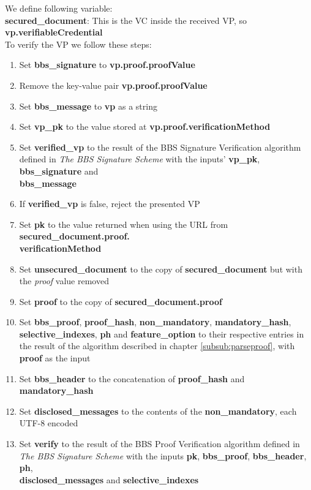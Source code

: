 \documentclass[
	a4paper               %
	,BCOR=0mm            %
	,bibliography=totoc   %
	,listof=totoc         %
	,monolingual
	,twoside=false
]{bfhthesis}              %
\begin{document}
We define following variable:\\
\textbf{secured\_document}: This is the VC inside the received VP, so \textbf{vp.verifiableCredential}\\

To verify the VP we follow these steps:
\begin{enumerate}
	\item Set \textbf{bbs\_signature} to \textbf{vp.proof.proofValue}
	\item Remove the key-value pair \textbf{vp.proof.proofValue}
	\item Set \textbf{bbs\_message} to \textbf{vp} as a string
	\item Set \textbf{vp\_pk} to the value stored at \textbf{vp.proof.verificationMethod}
	\item Set \textbf{verified\_vp} to the result of the BBS Signature Verification algorithm defined in \textit{The BBS Signature Scheme}\cite{bbs-signature-scheme} with the inputs' \textbf{vp\_pk}, \textbf{bbs\_signature} and \\\textbf{bbs\_message}
	\item If \textbf{verified\_vp} is false, reject the presented VP
	\item Set \textbf{pk} to the value returned when using the URL from \textbf{secured\_document.proof.}\\
	\noindent
	\textbf{verificationMethod}
	\item Set \textbf{unsecured\_document} to the copy of \textbf{secured\_document} but with the \textit{proof} value removed
	\item Set \textbf{proof} to the copy of \textbf{secured\_document.proof}
	\item Set \textbf{bbs\_proof}, \textbf{proof\_hash}, \textbf{non\_mandatory}, \textbf{mandatory\_hash}, \textbf{selective\_indexes}, \textbf{ph} and \textbf{feature\_option} to their respective entries in the result of the algorithm described in chapter \ref{subsub:parseproof}, with \textbf{proof} as the input
	\item Set \textbf{bbs\_header} to the concatenation of \textbf{proof\_hash} and \textbf{mandatory\_hash}
	\item Set \textbf{disclosed\_messages} to the contents of the \textbf{non\_mandatory}, each UTF-8 encoded
	\item Set \textbf{verify} to the result of the BBS Proof Verification algorithm defined in \textit{The BBS Signature Scheme}\cite{bbs-signature-scheme} with the inputs \textbf{pk}, \textbf{bbs\_proof}, \textbf{bbs\_header}, \textbf{ph}, \\\textbf{disclosed\_messages} and \textbf{selective\_indexes}
\end{enumerate}
\end{document}

